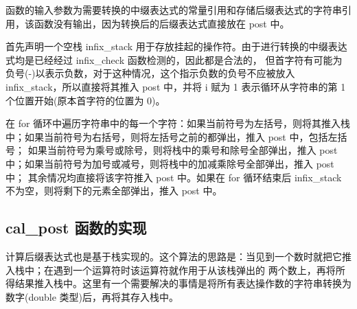 \documentclass[UTF8]{ctexart}
\begin{document}
函数的输入参数为需要转换的中缀表达式的常量引用和存储后缀表达式的字符串引用，该函数没有输出，因为转换后的后缀表达式直接放在 
post 中。

首先声明一个空栈 infix\_stack 用于存放挂起的操作符。由于进行转换的中缀表达式均是已经经过 infix\_check 函数检测的，因此都是合法的，
但首字符有可能为负号(-)以表示负数，对于这种情况，这个指示负数的负号不应被放入 infix\_stack，所以直接将其推入 post 中，并将 i 赋为 1 
表示循环从字符串的第 1 个位置开始(原本首字符的位置为 0)。

在 for 循环中遍历字符串中的每一个字符：如果当前符号为左括号，则将其推入栈中；如果当前符号为右括号，则将左括号之前的都弹出，推入 post 中，包括左括号；
如果当前符号为乘号或除号，则将栈中的乘号和除号全部弹出，推入 post 中；如果当前符号为加号或减号，则将栈中的加减乘除号全部弹出，推入 post 中；
其余情况均直接将该字符推入 post 中。如果在 for 循环结束后 infix\_stack 不为空，则将剩下的元素全部弹出，推入 post 中。

\subsection{cal\_post 函数的实现}
计算后缀表达式也是基于栈实现的。这个算法的思路是：当见到一个数时就把它推入栈中；在遇到一个运算符时该运算符就作用于从该栈弹出的
两个数上，再将所得结果推入栈中。这里有一个需要解决的事情是将所有表达操作数的字符串转换为数字(double 类型)后，再将其存入栈中。
\end{document}

